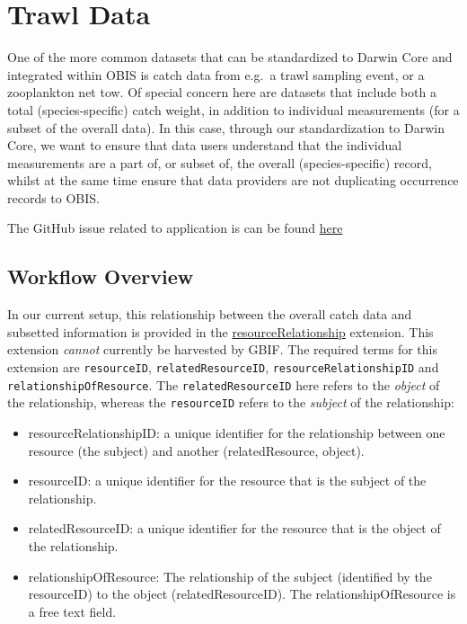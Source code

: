 \documentclass[
]{book}
\providecommand{\tightlist}{%
  \setlength{\itemsep}{0pt}\setlength{\parskip}{0pt}}
\begin{document}
\hypertarget{trawl-data}{%
\section{Trawl Data}\label{trawl-data}}

One of the more common datasets that can be standardized to Darwin Core and integrated within OBIS is catch data from e.g.~a trawl sampling event, or a zooplankton net tow. Of special concern here are datasets that include both a total (species-specific) catch weight, in addition to individual measurements (for a subset of the overall data). In this case, through our standardization to Darwin Core, we want to ensure that data users understand that the individual measurements are a part of, or subset of, the overall (species-specific) record, whilst at the same time ensure that data providers are not duplicating occurrence records to OBIS.

The GitHub issue related to application is can be found \href{https://github.com/iobis/env-data/issues/10}{here}

\hypertarget{workflow-overview}{%
\subsection{Workflow Overview}\label{workflow-overview}}

In our current setup, this relationship between the overall catch data and subsetted information is provided in the \href{https://tools.gbif.org/dwca-validator/extension.do?id=dwc:ResourceRelationship}{resourceRelationship} extension. This extension \emph{cannot} currently be harvested by GBIF. The required terms for this extension are \texttt{resourceID}, \texttt{relatedResourceID}, \texttt{resourceRelationshipID} and \texttt{relationshipOfResource}. The \texttt{relatedResourceID} here refers to the \emph{object} of the relationship, whereas the \texttt{resourceID} refers to the \emph{subject} of the relationship:

\begin{itemize}
\tightlist
\item
  resourceRelationshipID: a unique identifier for the relationship between one resource (the subject) and another (relatedResource, object).
\item
  resourceID: a unique identifier for the resource that is the subject of the relationship.
\item
  relatedResourceID: a unique identifier for the resource that is the object of the relationship.
\item
  relationshipOfResource: The relationship of the subject (identified by the resourceID) to the object (relatedResourceID). The relationshipOfResource is a free text field.
\end{itemize}
\end{document}
